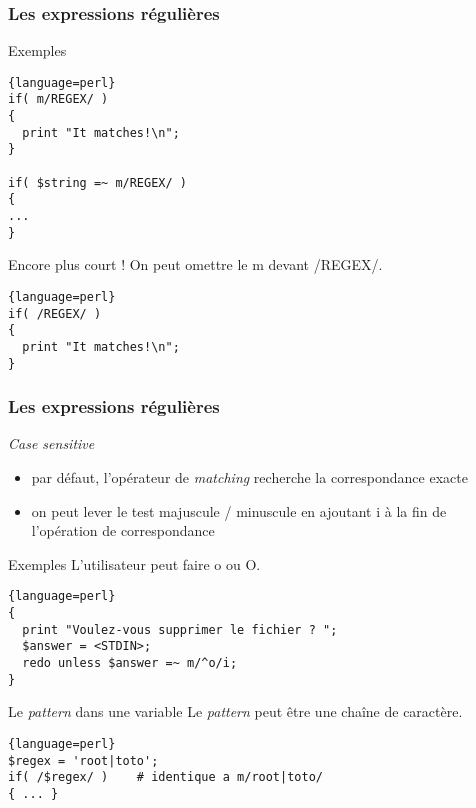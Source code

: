 \begin{frame}[fragile]
  \frametitle{Les expressions régulières}

  \begin{exampleblock}{Exemples}
    \begin{lstlisting}{language=perl}
if( m/REGEX/ )
{
  print "It matches!\n";
}

if( $string =~ m/REGEX/ )
{
...
}
    \end{lstlisting}
  \end{exampleblock}

  \begin{alertblock}{Encore plus court !}
    On peut omettre le m devant /REGEX/.
    \begin{lstlisting}{language=perl}
if( /REGEX/ )
{
  print "It matches!\n";
}
    \end{lstlisting}
  \end{alertblock}

\end{frame}

\begin{frame}[fragile]
  \frametitle{Les expressions régulières}

  \begin{block}{\textit{Case sensitive}}
    \begin{itemize}
    \item par défaut, l'opérateur de \textit{matching} recherche la
      correspondance exacte
    \item on peut lever le test majuscule / minuscule en ajoutant i à la fin
      de l'opération de correspondance
    \end{itemize}
  \end{block}

  \begin{exampleblock}{Exemples}
    L'utilisateur peut faire o ou O.
    \begin{lstlisting}{language=perl}
{
  print "Voulez-vous supprimer le fichier ? ";
  $answer = <STDIN>;
  redo unless $answer =~ m/^o/i;
}
    \end{lstlisting}
  \end{exampleblock}

  \begin{alertblock}{Le \textit{pattern} dans une variable}
    Le \textit{pattern} peut être une chaîne de caractère.
    \begin{lstlisting}{language=perl}
$regex = 'root|toto';
if( /$regex/ )    # identique a m/root|toto/
{ ... }
    \end{lstlisting}
  \end{alertblock}

\end{frame}

